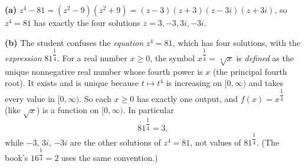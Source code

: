 \textbf{(a)} $z^4-81=(z^2-9)(z^2+9)=(z-3)(z+3)(z-3i)(z+3i)$, so $z^4=81$ has exactly the four solutions $z=3,-3,3i,-3i$.

\textbf{(b)} The student confuses the \emph{equation} $z^4=81$, which has four solutions, with the \emph{expression} $81^{\dfrac{1}{4}}$. For a real number $x\ge0$, the symbol $x^{\dfrac{1}{4}}=\sqrt[4]{x}$ is \emph{defined} as the unique nonnegative real number whose fourth power is $x$ (the principal fourth root). It exists and is unique because $t\mapsto t^4$ is increasing on $[0,\infty)$ and takes every value in $[0,\infty)$. So each $x\ge0$ has exactly one output, and $f(x)=x^{\dfrac{1}{4}}$ (like $\sqrt{x}$) is a function on $[0,\infty)$. In particular
\[
81^{\dfrac{1}{4}}=\boxed{3},
\]
while $-3$, $3i$, $-3i$ are the other solutions of $z^4=81$, not values of $81^{\dfrac{1}{4}}$. (The book's $16^{\dfrac{1}{4}}=2$ uses the same convention.)
